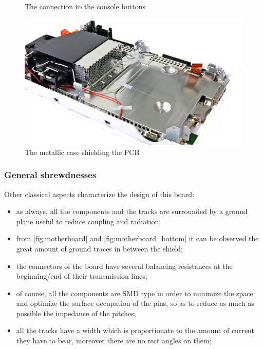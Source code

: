 \documentclass[11pt,a4paper,titlepage]{article}
\begin{document}
\begin{figure}[h]
\begin{minipage}{.5 \textwidth}
            \caption{The connection to the console buttons}
            \label{fig:button}
          \end{minipage}
          \hspace{5mm}
          \begin{minipage}{.5 \textwidth}
            \centering
            \includegraphics[width = .8\textwidth]{shield.png}
            \caption{The metallic case shielding the PCB}
            \label{fig:metalliccase}
          \end{minipage}
        \end{figure}

      \subsubsection{General shrewdnesses}
        Other classical aspects characterize the design of this board:
        \begin{itemize}
          \item as always, all the components and the tracks are surrounded by a ground plane useful to reduce coupling and radiation;
          \item from \autoref{fig:motherboard} and \autoref{fig:motherboard_bottom} it can be observed the great amount of ground traces in between the shield;
          \item the connectors of the board have several balancing resistances at the beginning/end of their transmission lines;
          \item of course, all the components are SMD type in order to minimize the space and optimize the surface occupation of the pins, so as to reduce as much as possible the impedance of the pitches;
          \item all the tracks have a width which is proportionate to the amount of current they have to bear, moreover there are no rect angles on them;
        \end{itemize}
\end{document}
